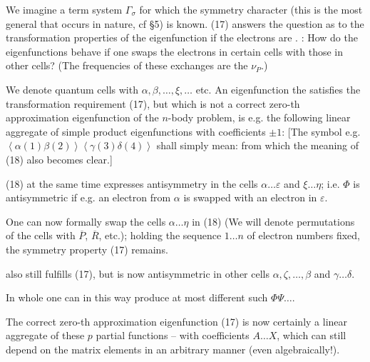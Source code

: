 \begin{paper}{1}
We imagine a term system $\Gamma_\sigma$ for which the symmetry character
(this is the most general that occurs in nature, cf \S5) is known. (17)  answers the question as to the transformation properties of the eigenfunction if the electrons are . : How do the eigenfunctions behave if one swaps the electrons in certain cells with those in other cells? (The frequencies of these exchanges are the $\nu_P$.)

We denote quantum cells with $\alpha,\beta,\dots,\xi,\dots$ etc. An eigenfunction the satisfies the transformation requirement (17), but which is not a correct zero-th approximation eigenfunction of the $n$-body problem, is e.g. the following linear aggregate of simple product eigenfunctions with coefficients $\pm 1$:
[The symbol e.g. $\left<\alpha(1)\beta(2)\right>\left<\gamma(3)\delta(4)\right>$ shall simply mean:
from which the meaning of (18) also becomes clear.]

(18) at the same time expresses antisymmetry in the cells $\alpha\dots\varepsilon$ and $\xi\dots\eta$; i.e. $\Phi$ is antisymmetric if e.g. an electron from $\alpha$ is swapped with an electron in $\varepsilon$.

One can now formally swap the cells $\alpha\dots\eta$ in (18) (We will denote permutations of the cells with $\overline{P}$, $\overline{R}$, etc.); holding the sequence $1\dots n$ of electron numbers fixed, the symmetry property (17) remains.

also still fulfills (17), but is now antisymmetric in other cells $\alpha,\zeta,\dots,\beta$ and $\gamma\dots\delta$.

In whole one can in this way produce at most
different such  $\Phi\Psi\dots$.

The correct zero-th approximation eigenfunction (17) is now certainly a linear aggregate of these $p$ partial functions
-- with coefficients $A\dots X$, which can still depend on the matrix elements in an arbitrary manner (even algebraically!).


\end{paper}
